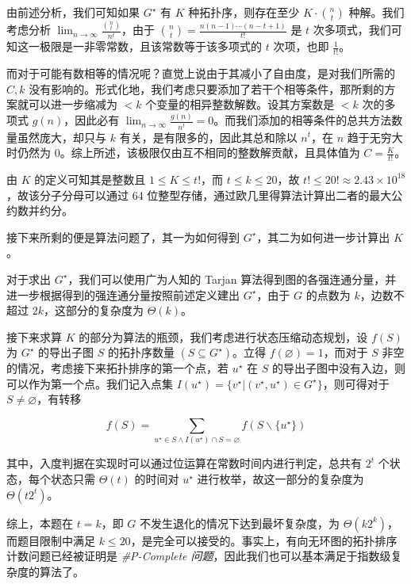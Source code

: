 \documentclass[12pt]{ctexart}
\begin{document}
由前述分析，我们可知如果 $G^\star$ 有 $K$ 种拓扑序，则存在至少 $K \cdot \binom n t$ 种解。我们考虑分析 $\lim_{n\rightarrow \infty} \frac{\binom n t}{n^t}$，由于 $\binom nt = \frac{n(n-1)\cdots(n-t+1)}{t!}$ 是 $t$ 次多项式，我们可知这一极限是一非零常数，且该常数等于该多项式的 $t$ 次项，也即 $\frac 1{t!}$。

而对于可能有数相等的情况呢？直觉上说由于其减小了自由度，是对我们所需的 $C,k$ 没有影响的。形式化地，我们考虑只要添加了若干个相等条件，那所剩的方案就可以进一步缩减为 $<k$ 个变量的相异整数解数。设其方案数是 $<k$ 次的多项式 $g(n)$，因此必有 $\lim_{n\rightarrow \infty} \frac {g(n)}{n^t}=0$。而我们添加的相等条件的总共方法数量虽然庞大，却只与 $k$ 有关，是有限多的，因此其总和除以 $n^t$，在 $n$ 趋于无穷大时仍然为 $0$。综上所述，该极限仅由互不相同的整数解贡献，且具体值为 $C=\frac K{t!}$。

由 $K$ 的定义可知其是整数且 $1\le K\le t!$，而 $t\le k\le 20$，故 $t! \leq 20! \approx 2.43\times 10^{18}$，故该分子分母可以通过 64 位整型存储，通过欧几里得算法计算出二者的最大公约数并约分。

接下来所剩的便是算法问题了，其一为如何得到 $G^\star$，其二为如何进一步计算出 $K$。

对于求出 $G^\star$，我们可以使用广为人知的 Tarjan 算法得到图的各强连通分量，并进一步根据得到的强连通分量按照前述定义建出 $G^\star$，由于 $G$ 的点数为 $k$，边数不超过 $2k$，这部分的复杂度为 $\Theta(k)$。

接下来求算 $K$ 的部分为算法的瓶颈，我们考虑进行状态压缩动态规划，设 $f(S)$ 为 $G^\star$ 的导出子图 $S$ 的拓扑序数量 $(S\subseteq G^\star)$。立得 $f(\varnothing)=1$，而对于 $S$ 非空的情况，考虑接下来拓扑排序的第一个点，若 $u^\star$ 在 $S$ 的导出子图中没有入边，则可以作为第一个点。我们记入点集 $I(u^\star)=\{v^\star \vert (v^\star,u^\star)\in G^\star\}$，则可得对于 $S\neq \varnothing$，有转移

$$
f(S) = \sum_{u^\star \in S\wedge I(u^\star) \cap S=\varnothing} f(S\backslash \{u^\star\})
$$

其中，入度判据在实现时可以通过位运算在常数时间内进行判定，总共有 $2^t$ 个状态，每个状态只需 $\Theta(t)$ 的时间对 $u^\star$ 进行枚举，故这一部分的复杂度为 $\Theta(t2^t)$。

综上，本题在 $t=k$，即 $G$ 不发生退化的情况下达到最坏复杂度，为 $\Theta(k2^k)$，而题目限制中满足 $k\le 20$，是完全可以接受的。事实上，有向无环图的拓扑排序计数问题已经被证明是 \emph{\#P-Complete 问题}\cite{sharppc}，因此我们也可以基本满足于指数级复杂度的算法了。

\newpage
\end{document}
